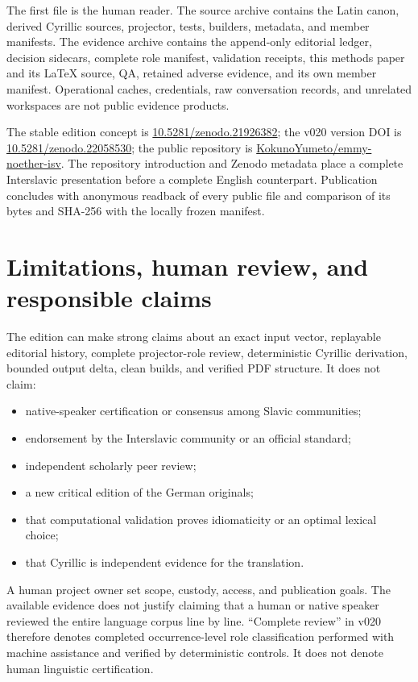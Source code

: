 \documentclass[11pt]{article}
\newcommand{\doiurl}[1]{\href{https://doi.org/#1}{#1}}
\newcommand{\repo}{\href{https://github.com/KokunoYumeto/emmy-noether-isv}{KokunoYumeto/emmy-noether-isv}}
\begin{document}
The first file is the human reader. The source archive contains the Latin canon, derived Cyrillic sources, projector, tests, builders, metadata, and member manifests. The evidence archive contains the append-only editorial ledger, decision sidecars, complete role manifest, validation receipts, this methods paper and its LaTeX source, QA, retained adverse evidence, and its own member manifest. Operational caches, credentials, raw conversation records, and unrelated workspaces are not public evidence products.

The stable edition concept is \doiurl{10.5281/zenodo.21926382}; the v020 version DOI is \doiurl{10.5281/zenodo.22058530}; the public repository is \repo. The repository introduction and Zenodo metadata place a complete Interslavic presentation before a complete English counterpart. Publication concludes with anonymous readback of every public file and comparison of its bytes and SHA-256 with the locally frozen manifest.

\section{Limitations, human review, and responsible claims}

The edition can make strong claims about an exact input vector, replayable editorial history, complete projector-role review, deterministic Cyrillic derivation, bounded output delta, clean builds, and verified PDF structure. It does not claim:

\begin{itemize}
\item native-speaker certification or consensus among Slavic communities;
\item endorsement by the Interslavic community or an official standard;
\item independent scholarly peer review;
\item a new critical edition of the German originals;
\item that computational validation proves idiomaticity or an optimal lexical choice;
\item that Cyrillic is independent evidence for the translation.
\end{itemize}

A human project owner set scope, custody, access, and publication goals. The available evidence does not justify claiming that a human or native speaker reviewed the entire language corpus line by line. ``Complete review'' in v020 therefore denotes completed occurrence-level role classification performed with machine assistance and verified by deterministic controls. It does not denote human linguistic certification.
\end{document}
